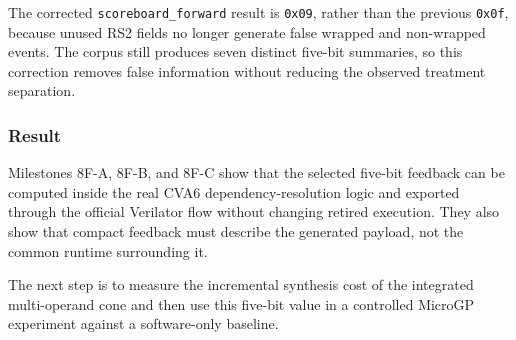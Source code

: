 The corrected \texttt{scoreboard\_forward} result is \texttt{0x09}, rather
than the previous \texttt{0x0f}, because unused RS2 fields no longer generate
false wrapped and non-wrapped events. The corpus still produces seven distinct
five-bit summaries, so this correction removes false information without
reducing the observed treatment separation.

\subsubsection*{Result}

Milestones 8F-A, 8F-B, and 8F-C show that the selected five-bit feedback can be
computed inside the real CVA6 dependency-resolution logic and exported through
the official Verilator flow without changing retired execution. They also show
that compact feedback must describe the generated payload, not the common
runtime surrounding it.

The next step is to measure the incremental synthesis cost of the integrated
multi-operand cone and then use this five-bit value in a controlled MicroGP
experiment against a software-only baseline.
